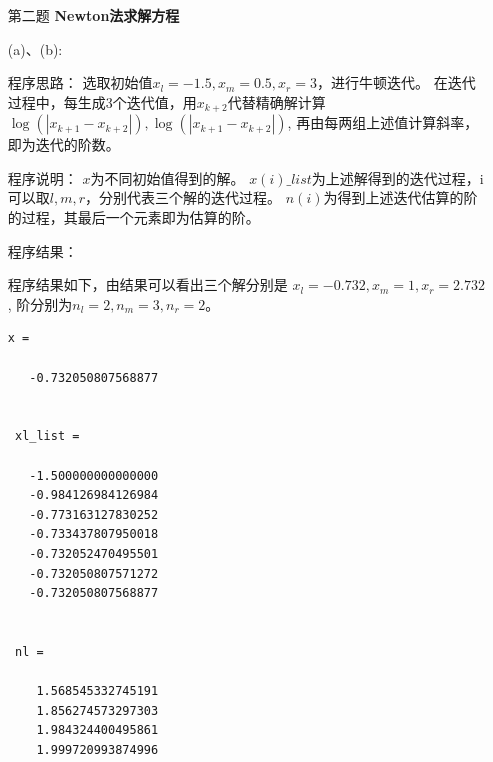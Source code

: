 \documentclass[12pt,a4paper,utf8]{ctexart}
\begin{document}
\begin{enumerate}
\begin{lstlisting}[frame=single]
err = zeros(1500,1);
x = eye(size(b));
tic
for i=1:1500
   err(i) = max(abs(x-x_exact));
   %if err(i)< 1e-15
   %    break;
   %end
   x = (eye(size(A))-w.*L_tilde)\...
   (((1-w).*eye(size(A))+w.*U_tilde)*x+w.*g); 
end
time = toc;

a = 1:1500;
semilogy(a,err)
s = ['\leftarrow w=',num2str(w)];
text(50,err(50),s,'FontSize',20)
hold on

end
\end{lstlisting}

\begin{lstlisting}[frame=single]
function [x,time] = S2(A,b,x_exact,w)
%S2 使用Sor迭代求解线性系统，加速

D = diag(A);
D_inv = 1./D;
err = zeros(1500,1);
x = eye(size(b));
xsize=size(b,1);
tic
for i=1:1500
   err(i)=max(abs(x-x_exact));
   x(1)=(1-w)*x(1)+w*D_inv(1)*(b(1)+x(2));
   for j=(1+1):(size(b,1)-1)
      x(j)=(1-w)*x(j)+w*D_inv(j)*(b(j)+x(j-1)+x(j+1));
   end
x(xsize) = (1-w)*x(xsize)+w*D_inv(xsize)* ...
(b(xsize)+x(xsize-1));
end
time = toc;
err(1500);
end
\end{lstlisting}

\item[第二题]\textbf{Newton法求解方程}

(a)、(b):

程序思路：
选取初始值$x_l=-1.5,x_m=0.5,x_r=3$，进行牛顿迭代。
在迭代过程中，每生成3个迭代值，用$x_{k+2}$代替精确解计算
$\log(|x_{k+1}-x_{k+2}|),\log(|x_{k+1}-x_{k+2}|)$,
再由每两组上述值计算斜率，即为迭代的阶数。

程序说明：
$x$为不同初始值得到的解。
$x(i)\_list$为上述解得到的迭代过程，i可以取$l,m,r$，分别代表三个解的迭代过程。
$n(i)$为得到上述迭代估算的阶的过程，其最后一个元素即为估算的阶。

程序结果：

程序结果如下，由结果可以看出三个解分别是
$x_l=-0.732,x_m=1,x_r=2.732$,
阶分别为$n_l=2,n_m=3,n_r=2$。

\begin{lstlisting}[frame=single]
   x =

   -0.732050807568877
 
 
 xl_list =
 
   -1.500000000000000
   -0.984126984126984
   -0.773163127830252
   -0.733437807950018
   -0.732052470495501
   -0.732050807571272
   -0.732050807568877
 
 
 nl =
 
    1.568545332745191
    1.856274573297303
    1.984324400495861
    1.999720993874996
 

\end{lstlisting}
\end{enumerate}
\end{document}
